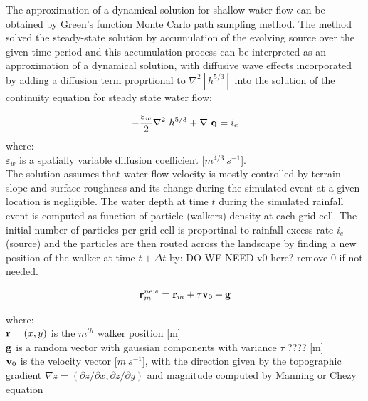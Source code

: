 \documentclass[gmd, manuscript]{copernicus}
\begin{document}
The approximation of a dynamical solution for shallow water flow
can be obtained by Green's function Monte Carlo path sampling method.
The method solved the steady-state solution by accumulation of the evolving source
over the given time period and this accumulation process can be interpreted as
an approximation of a dynamical solution,
with diffusive wave effects incorporated by adding a diffusion term proprtional to
$ \nabla^2 [h^{5/3}]$
into the solution of the continuity equation for steady state water flow:

\begin{equation}
\label{eq:difwater}
-{\varepsilon_w\over 2 }\nabla^2 ~ h^{5/3}
+\nabla ~ {\bf q} = i_e
\end{equation}
{\small
\noindent
 where: \\
 \noindent
 \hspace*{0.5em} $\varepsilon_w$ is a spatially variable diffusion coefficient [$\unit{m}^{4/3}~\unit{s}^{-1}$]. \\
}
The solution assumes that water flow velocity is mostly controlled by terrain slope and surface roughness 
and its change during the simulated event at a given location is negligible. 
The water depth at time $t$ during the simulated rainfall event
 is computed as function of particle (walkers) density at each grid cell. 
The initial number of particles per grid cell is proportinal to rainfall excess rate $i_e$ (source)
and the particles are then routed across the landscape by finding a new position of the walker at time $t + \Delta t$ by:
DO WE NEED v0 here? remove 0 if not needed.

\begin{equation}
{\bf r}_m^{new}={\bf r}_m + \tau {\bf v}_0 + {\bf g}
\end{equation}

{\small
\noindent
where: \\
\noindent
\hspace*{0.5em} ${\bf r} = (x, y)$ is the $m^{th}$ walker position [\unit{m}]\\
\hspace*{0.5em} ${\bf g}$ is a random vector with gaussian components with variance $\tau$ ????  [\unit{m}]\\
\hspace*{0.5em} ${\bf v}_0 $ is the velocity vector [$\unit{m~s^{-1}}$],  
 with the direction given by the topographic gradient $\nabla z = (\partial z / \partial x, \partial z / \partial y)$
and magnitude computed by Manning or Chezy equation\\ 
}
\end{document}
